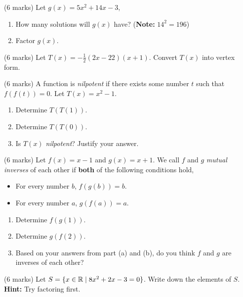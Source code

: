 \documentclass[12pt]{article} %
\begin{document}
\newpage

\begin{qstn}
  (6 marks) Let $g(x) = 5x^2 + 14x - 3$,
  \begin{enumerate}[label=(\alph*)]
    \item How many solutions will $g(x)$ have? (\textbf{Note: }$14^2 = 196$)
      \vspace*{3cm}

    \item Factor $g(x)$.
      \vspace*{7cm}

  \end{enumerate}
\end{qstn}

\begin{qstn}
  (6 marks) Let $T(x) = -\frac{1}{2}(2x - 22)(x + 1)$. Convert $T(x)$ into vertex form.
\end{qstn}

\newpage

\begin{qstn}
  (6 marks) A function is \emph{nilpotent} if there exists some number $t$ such that \\
  $f(f(t)) = 0$. Let  $T(x) = x^2 - 1$.
  \begin{enumerate}[label=(\alph*)]
    \item Determine $T(T(1))$.
      \vspace*{4cm}

    \item Determine $T(T(0))$.
      \vspace*{4cm}

    \item Is $T(x)$ \emph{nilpotent}? Justify your answer.
      \vspace*{2cm}

  \end{enumerate}
\end{qstn}

\begin{qstn}
  (6 marks) Let $f(x) = x - 1$ and $g(x) = x + 1$. We call $f$ and $g$ \emph{mutual inverses} of each other if \textbf{both} of the following conditions
  hold,
  \begin{itemize}
    \item For every number $b$,  $f(g(b)) = b$.
    \item For every number $a$,  $g(f(a)) = a$.
  \end{itemize}

  \begin{enumerate}[label=(\alph*)]
    \item Determine $f(g(1))$.
      \newpage

    \item Determine $g(f(2))$.
      \vspace*{4cm}

    \item Based on your answers from part (a) and (b), do you think $f$ and $g$ are inverses of each other?
      \vspace*{4cm}

  \end{enumerate}
\end{qstn}

\begin{qstn}
  (6 marks) Let $S = \{x \in \mathbb R \mid 8x^2 + 2x - 3 = 0\}$. Write down the elements of $S$.\\
  \textbf{Hint: }Try factoring first.
\end{qstn}
\end{document}
